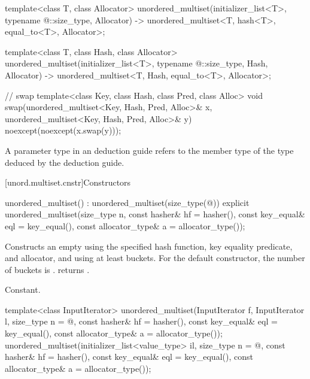\begin{codeblock}
{  template<class T, class Allocator>
    unordered_multiset(initializer_list<T>, typename @\seebelow@::size_type, Allocator)
      -> unordered_multiset<T, hash<T>, equal_to<T>, Allocator>;

  template<class T, class Hash, class Allocator>
    unordered_multiset(initializer_list<T>, typename @\seebelow@::size_type, Hash, Allocator)
      -> unordered_multiset<T, Hash, equal_to<T>, Allocator>;

  // swap
  template<class Key, class Hash, class Pred, class Alloc>
    void swap(unordered_multiset<Key, Hash, Pred, Alloc>& x,
              unordered_multiset<Key, Hash, Pred, Alloc>& y)
      noexcept(noexcept(x.swap(y)));
}
\end{codeblock}

\pnum
A  parameter type in an  deduction guide
refers to the  member type of
the type deduced by the deduction guide.

[unord.multiset.cnstr]{Constructors}

%
\begin{itemdecl}
unordered_multiset() : unordered_multiset(size_type(@\seebelow@)) { }
explicit unordered_multiset(size_type n,
                            const hasher& hf = hasher(),
                            const key_equal& eql = key_equal(),
                            const allocator_type& a = allocator_type());
\end{itemdecl}

\begin{itemdescr}
\pnum
\effects
Constructs an empty  using the
specified hash function, key equality predicate, and allocator, and
using at least  buckets.  For the default constructor,
the number of buckets is .
 returns .

\pnum
\complexity
Constant.
\end{itemdescr}

%
\begin{itemdecl}
template<class InputIterator>
  unordered_multiset(InputIterator f, InputIterator l,
                     size_type n = @\seebelow@,
                     const hasher& hf = hasher(),
                     const key_equal& eql = key_equal(),
                     const allocator_type& a = allocator_type());
unordered_multiset(initializer_list<value_type> il,
                   size_type n = @\seebelow@,
                   const hasher& hf = hasher(),
                   const key_equal& eql = key_equal(),
                   const allocator_type& a = allocator_type());
\end{itemdecl}

